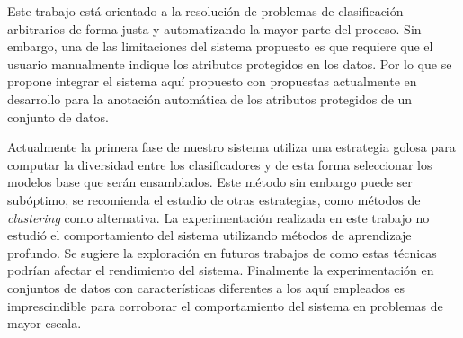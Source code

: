 \begin{recomendations}

Este trabajo está orientado a la resolución de problemas de clasificación arbitrarios de forma justa y automatizando la mayor parte del proceso.
Sin embargo, una de las limitaciones del sistema propuesto es que requiere que el usuario manualmente indique los atributos protegidos en los datos.
Por lo que se propone integrar el sistema aquí propuesto con propuestas actualmente en desarrollo para la anotación automática de los atributos protegidos de un conjunto de datos.

Actualmente la primera fase de nuestro sistema utiliza una estrategia golosa para computar la diversidad entre los clasificadores y de esta forma seleccionar los modelos base que serán ensamblados.
Este método sin embargo puede ser subóptimo, se recomienda el estudio de otras estrategias, como métodos de \emph{clustering} como alternativa.
La experimentación realizada en este trabajo no estudió el comportamiento del sistema utilizando métodos de aprendizaje profundo.
Se sugiere la exploración en futuros trabajos de como estas técnicas podrían afectar el rendimiento del sistema.
Finalmente la experimentación en conjuntos de datos con características diferentes a los aquí empleados es imprescindible para corroborar el comportamiento del sistema en problemas de mayor escala.

\end{recomendations}
